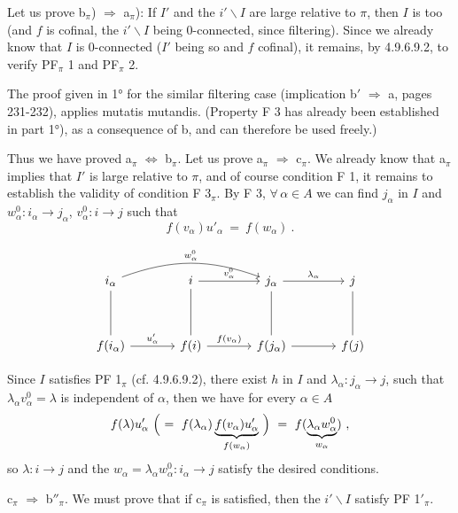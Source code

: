 \documentclass[11pt]{article}
\newcommand{\printedpage}[1]{\marginpar{\footnotesize p.~#1}}
\newcommand{\msp}[1]{\marginpar{\footnotesize [#1]}}
\begin{document}
Let us prove b$_\pi$) $\Longrightarrow$ a$_\pi$): If $I'$ and the $i'\backslash I$ are large relative to $\pi$, then $I$ is too (and $f$ is cofinal, the $i'\backslash I$ being 0-connected, since filtering). Since we already know that $I$ is 0-connected ($I'$ being so and $f$ cofinal), it remains, by 4.9.6.9.2, to verify PF$_\pi$ 1 and PF$_\pi$ 2.

\msp{page 240}
The proof given in 1° for the similar filtering case (implication b$'$ $\Longrightarrow$ a, pages 231-232), applies mutatis mutandis. (Property F 3 has already been established in part 1°), as a consequence of b, and can therefore be used freely.)

Thus we have proved a$_\pi$ $\Longleftrightarrow$ b$_\pi$. Let us prove a$_\pi$ $\Longrightarrow$ c$_\pi$. We already know that a$_\pi$ implies that $I'$ is large relative to $\pi$, and of course condition F 1, it remains to establish the validity of condition F 3$_\pi$. By F 3, $\forall\, \alpha \in A$ we can find $j_\alpha$ in $I$ and $w^0_\alpha : i_\alpha \longrightarrow j_\alpha$, $v^0_\alpha : i \longrightarrow j$ such that %
\[
f(v_\alpha)u'_\alpha \ = \ f(w_\alpha) \ .
\]

\printedpage{90}

\[
\begin{tikzcd}[column sep=large, row sep=huge]
i_\alpha \arrow[rr, bend left=20, "w^0_\alpha"] \arrow[d, dash] & i \arrow[r, "v^0_\alpha"] \arrow[d, dash] & j_\alpha \arrow[r, "\lambda_\alpha"] \arrow[d, dash] & j \arrow[d, dash] \\
f(i_\alpha) \arrow[r, "u'_\alpha"] & f(i) \arrow[r, "f(v_\alpha)"] & f(j_\alpha) \arrow[r] & f(j)
\end{tikzcd}
\]

Since $I$ satisfies PF 1$_\pi$ (cf. 4.9.6.9.2), there exist $h$ in $I$ and $\lambda_\alpha : j_\alpha \longrightarrow j$, such that $\lambda_\alpha v^0_\alpha = \lambda$ is independent of $\alpha$, then we have for every $\alpha \in A$ %
\[
f(\lambda)u'_\alpha \ \Bigl( \ = \ f(\lambda_\alpha)\underbrace{f(v_\alpha)u'_\alpha}_{f(w_\alpha)} \ \Bigr) \ = \ f(\underbrace{\lambda_\alpha w^0_\alpha}_{w_\alpha}) \ ,
\]
so $\lambda : i \longrightarrow j$ and the $w_\alpha = \lambda_\alpha w^0_\alpha : i_\alpha \longrightarrow j$ satisfy the desired conditions.

c$_\pi$ $\Longrightarrow$ b$''_\pi$. We must prove that if c$_\pi$ is satisfied, then the $i'\backslash I$ satisfy PF 1$'_\pi$.
\end{document}
